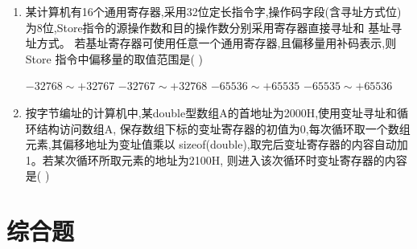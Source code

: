 \documentclass[12pt, a4paper, oneside, UTF8]{ctexbook}
\begin{document}
\begin{enumerate}
    \item 某计算机有16个通用寄存器,采用32位定长指令字,操作码字段(含寻址方式位)为8位,Store指令的源操作数和目的操作数分别采用寄存器直接寻址和 基址寻址方式。
    若基址寄存器可使用任意一个通用寄存器,且偏移量用补码表示,则Store 指令中偏移量的取值范围是(   ) 
    \begin{choices}[2]
        \task $-32768\sim +32767$ \task $-32767\sim +32768$ 
        \task $-65536\sim +65535$ \task $-65535\sim +65536$ 
    \end{choices}


    \item 按字节编址的计算机中,某double型数组A的首地址为2000H,使用变址寻址和循环结构访问数组A,
    保存数组下标的变址寄存器的初值为0,每次循环取一个数组元素,其偏移地址为变址值乘以
    sizeof(double),取完后变址寄存器的内容自动加1。若某次循环所取元素的地址为2100H,
    则进入该次循环时变址寄存器的内容是(   )
    \begin{choices}
       
    \end{choices} 

\end{enumerate}

\section{综合题}
\ifx\allfiles\undefined
\end{document}
